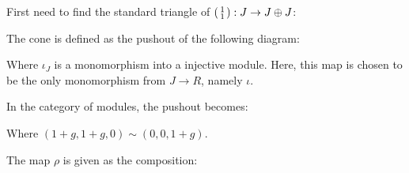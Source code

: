 First need to find the standard triangle of \( \begin{psmallmatrix} 1 \\ 1 \end{psmallmatrix}: J \to J \oplus J \):

The cone is defined as the pushout of the following diagram:

\begin{center}
\end{center}

Where \( \iota_J \) is a monomorphism into a injective module. Here, this map is chosen to be the only monomorphism from \( J \to R \), namely \( \iota \).

In the category of modules, the pushout becomes:

\begin{center}
\end{center}

Where \( (1 + g, 1 + g, 0) \sim (0, 0, 1 + g) \).

The map \( \rho \) is given as the composition:
\begin{center}
\end{center}

